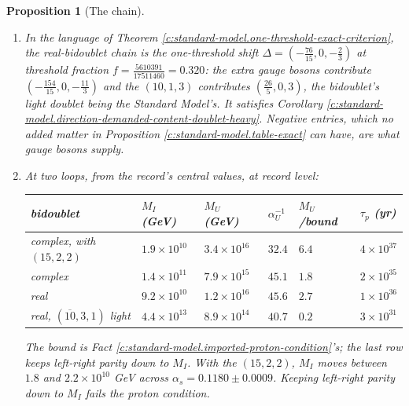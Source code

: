 \documentclass[11pt]{article}
\newtheorem{proposition}[theorem]{Proposition}
\theoremstyle{definition}
\theoremstyle{plain}
\providecommand{\Dl}{}\renewcommand{\Dl}{\Delta}
\begin{document}
\begin{proposition}[The chain]
\begin{enumerate}
\begin{center}
\begin{tabular}{@{}llllll@{}}
\bottomrule
\end{tabular}
\end{center}
\item[(3)] In the language of Theorem \ref{c:standard-model.one-threshold-exact-criterion}, the real-bidoublet chain is the one-threshold shift $\Dl = (-\tfrac{76}{15}, 0, -\tfrac23)$ at threshold fraction $f = \tfrac{5610391}{17511460} = 0.320$: the extra gauge bosons contribute $(-\tfrac{154}{15}, 0, -\tfrac{11}{3})$ and the $(10,1,3)$ contributes $(\tfrac{26}{5}, 0, 3)$, the bidoublet's light doublet being the Standard Model's. It satisfies Corollary \ref{c:standard-model.direction-demanded-content-doublet-heavy}. Negative entries, which no added matter in Proposition \ref{c:standard-model.table-exact} can have, are what gauge bosons supply.
\item[(4)] At two loops, from the record's central values, at record level:
\begin{center}\small
\begin{tabular}{@{}llllll@{}}
\toprule
bidoublet & $M_{I}$ (GeV) & $M_{U}$ (GeV) & $\alpha_{U}^{-1}$ & $M_{U}$/bound & $\tau_{p}$ (yr) \\
\midrule
complex, with $(15,2,2)$ & $1.9 \times 10^{10}$ & $3.4 \times 10^{16}$ & $32.4$ & $6.4$ & $4 \times 10^{37}$ \\
complex & $1.4 \times 10^{11}$ & $7.9 \times 10^{15}$ & $45.1$ & $1.8$ & $2 \times 10^{35}$ \\
real & $9.2 \times 10^{10}$ & $1.2 \times 10^{16}$ & $45.6$ & $2.7$ & $1 \times 10^{36}$ \\
real, $(\overline{10},3,1)$ light & $4.4 \times 10^{13}$ & $8.9 \times 10^{14}$ & $40.7$ & $0.2$ & $3 \times 10^{31}$ \\
\bottomrule
\end{tabular}
\end{center}
The bound is Fact \ref{c:standard-model.imported-proton-condition}'s; the last row keeps left-right parity down to $M_{I}$. With the $(15,2,2)$, $M_{I}$ moves between $1.8$ and $2.2 \times 10^{10}$ GeV across $\alpha_{s} = 0.1180 \pm 0.0009$. Keeping left-right parity down to $M_{I}$ fails the proton condition.
\end{enumerate}
\end{proposition}
\end{document}
